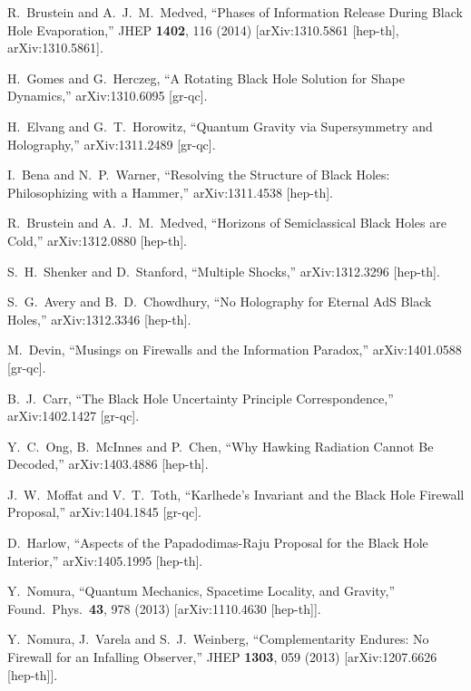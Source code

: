 \documentclass[12pt]{article}
\begin{document}
\begin{thebibliography}{99}
  R.~Brustein and A.~J.~M.~Medved,
  ``Phases of Information Release During Black Hole Evaporation,''
  JHEP {\bf 1402}, 116 (2014)
  [arXiv:1310.5861 [hep-th], arXiv:1310.5861].

  H.~Gomes and G.~Herczeg,
  ``A Rotating Black Hole Solution for Shape Dynamics,''
  arXiv:1310.6095 [gr-qc].

  H.~Elvang and G.~T.~Horowitz,
  ``Quantum Gravity via Supersymmetry and Holography,''
  arXiv:1311.2489 [gr-qc].  

  I.~Bena and N.~P.~Warner,
  ``Resolving the Structure of Black Holes: Philosophizing with a Hammer,''
  arXiv:1311.4538 [hep-th].

  R.~Brustein and A.~J.~M.~Medved,
  ``Horizons of Semiclassical Black Holes are Cold,''
  arXiv:1312.0880 [hep-th].  

  S.~H.~Shenker and D.~Stanford,
  ``Multiple Shocks,''
  arXiv:1312.3296 [hep-th].  

  S.~G.~Avery and B.~D.~Chowdhury,
  ``No Holography for Eternal AdS Black Holes,''
  arXiv:1312.3346 [hep-th].  

  M.~Devin,
  ``Musings on Firewalls and the Information Paradox,''
  arXiv:1401.0588 [gr-qc].

  B.~J.~Carr,
  ``The Black Hole Uncertainty Principle Correspondence,''
  arXiv:1402.1427 [gr-qc].

  Y.~C.~Ong, B.~McInnes and P.~Chen,
  ``Why Hawking Radiation Cannot Be Decoded,''
  arXiv:1403.4886 [hep-th].

  J.~W.~Moffat and V.~T.~Toth,
  ``Karlhede's Invariant and the Black Hole Firewall Proposal,''
  arXiv:1404.1845 [gr-qc].

  D.~Harlow,
  ``Aspects of the Papadodimas-Raju Proposal for the Black Hole Interior,''
  arXiv:1405.1995 [hep-th].

  Y.~Nomura,
  ``Quantum Mechanics, Spacetime Locality, and Gravity,''
  Found.\ Phys.\  {\bf 43}, 978 (2013)
  [arXiv:1110.4630 [hep-th]].
  
  Y.~Nomura, J.~Varela and S.~J.~Weinberg,
  ``Complementarity Endures: No Firewall for an Infalling Observer,''
  JHEP {\bf 1303}, 059 (2013) [arXiv:1207.6626 [hep-th]].  


\end{thebibliography}
\end{document}
